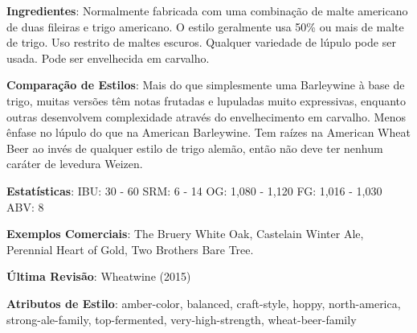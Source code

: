 \textbf{Ingredientes}: Normalmente fabricada com uma combinação de malte americano de duas fileiras e trigo americano. O estilo geralmente usa 50\% ou mais de malte de trigo. Uso restrito de maltes escuros. Qualquer variedade de lúpulo pode ser usada. Pode ser envelhecida em carvalho.

\textbf{Comparação de Estilos}: Mais do que simplesmente uma Barleywine à base de trigo, muitas versões têm notas frutadas e lupuladas muito expressivas, enquanto outras desenvolvem complexidade através do envelhecimento em carvalho. Menos ênfase no lúpulo do que na American Barleywine. Tem raízes na American Wheat Beer ao invés de qualquer estilo de trigo alemão, então não deve ter nenhum caráter de levedura Weizen.

\textbf{Estatísticas}: IBU: 30 - 60
SRM: 6 - 14
OG: 1,080 - 1,120
FG: 1,016 - 1,030
ABV: 8%

\textbf{Exemplos Comerciais}: The Bruery White Oak, Castelain Winter Ale, Perennial Heart of Gold, Two Brothers Bare Tree.

\textbf{Última Revisão}: Wheatwine (2015)

\textbf{Atributos de Estilo}: amber-color, balanced, craft-style, hoppy, north-america, strong-ale-family, top-fermented, very-high-strength, wheat-beer-family
